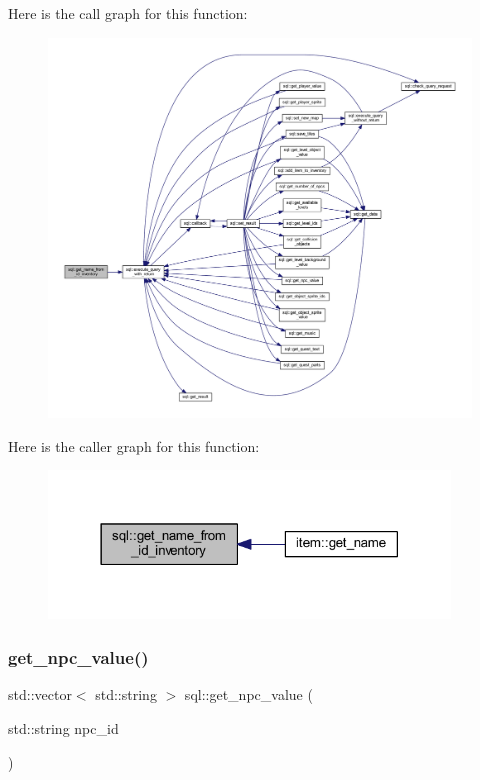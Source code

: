 Here is the call graph for this function\+:
\nopagebreak
\begin{figure}[H]
\begin{center}
\leavevmode
\includegraphics[width=350pt]{classsql_a7b49bcf5ac10f6421a5ecd62865e3316_cgraph}
\end{center}
\end{figure}
Here is the caller graph for this function\+:
\nopagebreak
\begin{figure}[H]
\begin{center}
\leavevmode
\includegraphics[width=302pt]{classsql_a7b49bcf5ac10f6421a5ecd62865e3316_icgraph}
\end{center}
\end{figure}
\mbox{\label{classsql_af04403a0cab4ee13a6f70b396e5b3a20}} 
\subsubsection{\texorpdfstring{get\+\_\+npc\+\_\+value()}{get\_npc\_value()}}
{\footnotesize\ttfamily std\+::vector$<$ std\+::string $>$ sql\+::get\+\_\+npc\+\_\+value (\begin{DoxyParamCaption}\item[{std\+::string}]{npc\+\_\+id }\end{DoxyParamCaption})}



